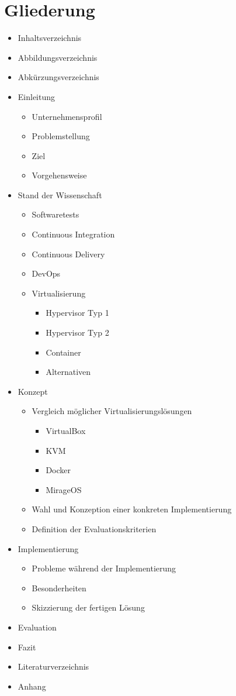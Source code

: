 \section{Gliederung}

\begin{itemize}
\item Inhaltsverzeichnis
\item Abbildungsverzeichnis
\item Abkürzungsverzeichnis
\item Einleitung
    \begin{itemize}
    \item Unternehmensprofil
    \item Problemstellung
    \item Ziel
    \item Vorgehensweise
    \end{itemize}
\item Stand der Wissenschaft
    \begin{itemize}
    \item Softwaretests
    \item Continuous Integration
    \item Continuous Delivery
    \item DevOps
    \item Virtualisierung
        \begin{itemize}
        \item Hypervisor Typ 1
        \item Hypervisor Typ 2
        \item Container
        \item Alternativen
        \end{itemize}
    \end{itemize}
\item Konzept
    \begin{itemize}
    \item Vergleich möglicher Virtualisierungslösungen
        \begin{itemize}
        \item VirtualBox
        \item KVM
        \item Docker
        \item MirageOS
        \end{itemize}
    \item Wahl und Konzeption einer konkreten Implementierung
    \item Definition der Evaluationskriterien
    \end{itemize}
\item Implementierung
    \begin{itemize}
    \item Probleme während der Implementierung
    \item Besonderheiten
    \item Skizzierung der fertigen Lösung
    \end{itemize}
\item Evaluation
\item Fazit
\item Literaturverzeichnis
\item Anhang
\end{itemize}
